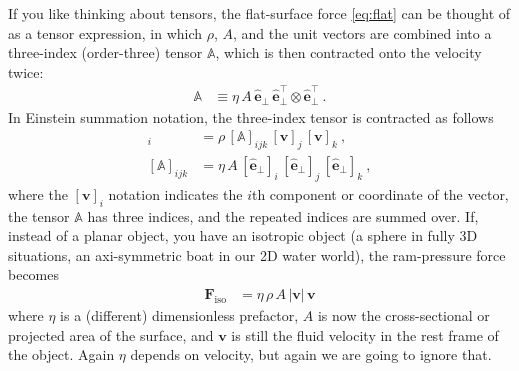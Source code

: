 \documentclass[letterpaper]{article}
\renewcommand{\vec}[1]{\boldsymbol{#1}}
\newcommand{\uvec}{\vec{\hat{e}}}
\newcommand{\tensor}[1]{\mathbb{#1}}
\renewcommand{\flat}{\text{flat}}
\newcommand{\iso}{\text{iso}}
\begin{document}
If you like thinking about tensors, the flat-surface force \eqref{eq:flat}  can be thought of as a tensor expression, in which $\rho$, $A$, and the unit vectors are combined into a three-index (order-three) tensor $\tensor{A}$, which is then contracted onto the velocity twice:
\begin{align}
    \tensor{A} &\equiv \eta\,A\,\uvec_\perp\,\uvec_\perp^\top\otimes\uvec_\perp^\top ~.
\end{align}
In Einstein summation notation, the three-index tensor is contracted as follows
\begin{align}
    [\vec{F}_\flat]_i &= \rho\,[\tensor{A}]_{ijk}\,[\vec{v}]_j\,[\vec{v}]_k ~,
    \\
    [\tensor{A}]_{ijk} &= \eta\,A\,[\uvec_\perp]_i\,[\uvec_\perp]_j\,[\uvec_\perp]_k
    ~,
\end{align}
where the $[\vec{v}]_i$ notation indicates the $i$th component or coordinate of the vector, the tensor $\tensor{A}$ has three indices, and the repeated indices are summed over.
If, instead of a planar object, you have an isotropic object (a sphere in fully 3D situations, an axi-symmetric boat in our 2D water world), the ram-pressure force becomes
\begin{align}\label{eq:iso}
    \vec{F}_\iso &= \eta\,\rho\,A\,|\vec{v}|\,\vec{v}
\end{align}
where $\eta$ is a (different) dimensionless prefactor, $A$ is now the cross-sectional or projected area of the surface, and $\vec{v}$ is still the fluid velocity in the rest frame of the object.
Again $\eta$ depends on velocity, but again we are going to ignore that.
\end{document}

